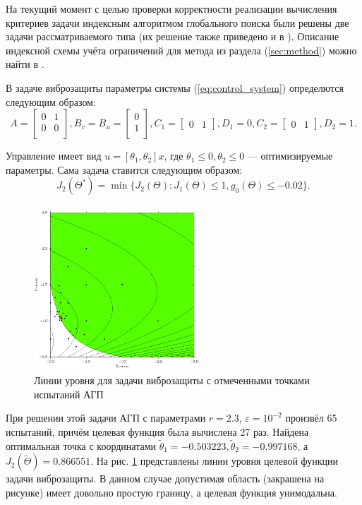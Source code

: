На текущий момент с целью проверки корректности реализации вычисления критериев задачи
индексным алгоритмом глобального поиска были решены две задачи рассматриваемого типа
(их решение также приведено и в \cite{optControl}).
Описание индексной схемы учёта ограничений для метода из раздела (\ref{sec:method}) можно
найти в \cite{strongSerg}.

В задаче виброзащиты параметры системы (\ref{eq:control_system}) определются следующим
образом:
$$
A=\begin{bmatrix}
    0       & 1 \\
    0       & 0 \\
\end{bmatrix},
B_v=B_u=\begin{bmatrix}
  0       \\
  1       \\
\end{bmatrix},
C_1=\begin{bmatrix}
  0     & 1
\end{bmatrix},D_1=0,
C_2=\begin{bmatrix}
  0     & 1
\end{bmatrix},D_2=1.
$$

Управление имеет вид \(u=[\theta_1,\theta_2]x\), где \(\theta_1 \leqslant 0,\theta_2\leqslant 0\) ---
оптимизируемые параметры. Сама задача ставится следующим образом:
\begin{displaymath}
   J_2(\Theta^*)=\min\{J_2(\Theta):J_1(\Theta)\leqslant 1, g_0(\Theta)\leqslant -0.02\}.
\end{displaymath}

\begin{figure}[ht]
  \center
  \includegraphics[width=0.55\textwidth]{images/controlProblem.png}
  \caption{Линии уровня для задачи виброзащиты с отмеченными точками испытаний АГП}
  \label{fig:controlProblem}
\end{figure}
При решении этой задачи АГП с параметрами \(r=2.3\), \(\varepsilon=10^{-2}\) произвёл
65 испытаний, причём целевая функция была вычислена 27 раз. Найдена оптимальная точка с координатами
\(\widetilde\theta_1 =-0.503223,\widetilde\theta_2=-0.997168\), а \(J_2(\widetilde\Theta)=0.866551\).
На рис. \ref{fig:controlProblem}
представлены линии уровня целевой функции задачи виброзащиты. В данном случае допустимая область (закрашена на рисунке)
имеет довольно простую границу, а целевая функция унимодальна.


